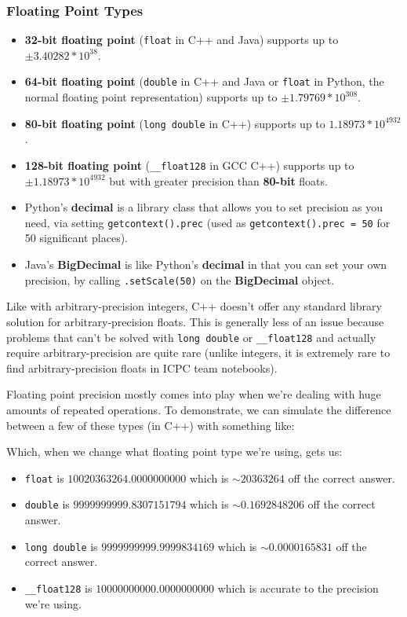\subsubsection{Floating Point Types}

\begin{itemize}
\item \textbf{32-bit floating point} (\texttt{float} in C++ and Java) supports up to $\pm3.40282 * 10^{38}$.
\item \textbf{64-bit floating point} (\texttt{double} in C++ and Java or \texttt{float} in Python, the normal floating point representation) supports up to $\pm1.79769 * 10^{308}$.
\item \textbf{80-bit floating point} (\texttt{long double} in C++) supports up to $1.18973 * 10^{4932}$.
\item \textbf{128-bit floating point} (\texttt{__float128} in GCC C++) supports up to $\pm1.18973 * 10^{4932}$ but with greater precision than \textbf{80-bit} floats.
\item Python's \textbf{decimal} is a library class that allows you to set precision as you need, via setting \texttt{getcontext().prec} (used as \texttt{getcontext().prec = 50} for 50 significant places).
\item Java's \textbf{BigDecimal} is like Python's \textbf{decimal} in that you can set your own precision, by calling \texttt{.setScale(50)} on the \textbf{BigDecimal} object.
\end{itemize}

Like with arbitrary-precision integers, C++ doesn't offer any standard library solution for arbitrary-precision floats. This is generally less of an issue because problems that can't be solved with \texttt{long double} or \texttt{__float128} and actually require arbitrary-precision are quite rare (unlike integers, it is extremely rare to find arbitrary-precision floats in ICPC team notebooks).

Floating point precision mostly comes into play when we're dealing with huge amounts of repeated operations. To demonstrate, we can simulate the difference between a few of these types (in C++) with something like:


Which, when we change what floating point type we're using, gets us:

\begin{itemize}
\item \texttt{float} is $10020363264.0000000000$ which is $\sim20363264$ off the correct answer.
\item \texttt{double} is $9999999999.8307151794$ which is $\sim0.1692848206$ off the correct answer.
\item \texttt{long double} is $9999999999.9999834169$ which is $\sim0.0000165831$ off the correct answer.
\item \texttt{__float128} is $10000000000.0000000000$ which is accurate to the precision we're using.
\end{itemize}

